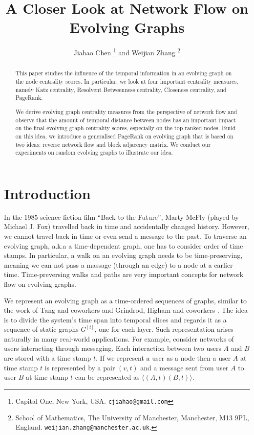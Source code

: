 \documentclass[12pt]{article}
\title{A Closer Look at Network Flow on Evolving Graphs}
\author{Jiahao Chen \thanks{
Capital One,
New York, USA.
\texttt{cjiahao@gmail.com}
}
 and
Weijian Zhang
\thanks{%
  School of Mathematics,
The University of Manchester,
                Manchester, M13 9PL, England.
\texttt{weijian.zhang@manchester.ac.uk}.
}
}
\theoremstyle{definition}
\begin{document}


\maketitle

\begin{abstract}
This paper studies the influence of the temporal information in an evolving graph on the node centrality scores.
In particular, we look at four important centrality measures, namely Katz centrality,
Resolvent Betweenness centrality, Closeness centrality, and PageRank.

We derive evolving graph centrality measures from the perspective of network flow and
observe that the amount of temporal distance between nodes has an important impact on the final evolving graph centrality scores, especially on the top ranked nodes.
Build on this idea, we introduce a generalised PageRank on evolving graph that is based on two ideas:
reverse network flow and block adjacency matrix.
We conduct our experiments on random evolving graphs to illustrate our idea.
\end{abstract}

\section{Introduction}
\label{sec:introduction}

In the 1985 science-fiction film ``Back to the Future'', Marty McFly (played by Michael J. Fox) travelled back in time and accidentally changed history.
However, we cannot travel back in time or even send a message to the past.
To traverse an evolving graph, a.k.a a time-dependent graph, one has to consider order of time stamps. In particular, a walk on an evolving graph needs to be time-preserving, meaning we
can not pass a massage (through an edge) to a node at a earlier time.
Time-preversing walks and paths are very important concepts for
network flow on evolving graphs.

We represent an evolving graph as a time-ordered sequences of graphs, similar to the work of Tang and coworkers \cite{nicosia13, tang09, tang102, tang10} and Grindrod, Higham and coworkers \cite{grindrod13,grindrod11}. The idea is to divide the system's time span into temporal slices and regards it as a sequence of static graphs $G^{[t]}$, one for each layer. Such representation arises naturally in many real-world applications. For example,
consider networks of users interacting through messaging. Each interaction between two users $A$ and $B$ are stored with a time stamp $t$. If we represent a user as a node then a user $A$ at time stamp $t$ is represented by a pair $(v,t)$ and a message sent from user $A$ to user $B$ at time stamp $t$ can be represented as $\langle (A, t) (B, t) \rangle$.
\end{document}
